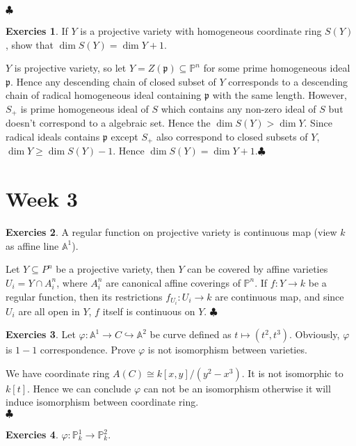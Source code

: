 \documentclass[12pt,a4paper]{article}
\theoremstyle{definition}
\newtheorem{exer}{Exercies}[subsection]
\newcommand*{\qeds}{\hfill\ensuremath{\clubsuit}}
\begin{document}
\qeds
\begin{exer}
	If $Y$ is a projective variety with homogeneous coordinate ring $S(Y)$, show that $\dim S(Y) = \dim Y +1$.
\end{exer}
$Y$ is projective variety, so let $Y= Z(\mathfrak{p}) \subseteq \mathbb{P}^n$ for some prime homogeneous ideal $\mathfrak{p}$. Hence any descending chain of closed subset of $Y$ corresponds to a descending chain of radical homogeneous ideal containing $\mathfrak{p}$ with the same length. However, $S_+$ is prime homogeneous ideal of $S$ which contains any non-zero ideal of $S$ but doesn't correspond to a algebraic set. Hence the $\dim S(Y) > \dim Y$. Since radical ideals contains $\mathfrak{p}$ except $S_+$ also correspond to closed subsets of $Y$, $\dim Y  \geq \dim S(Y)-1$. Hence $\dim S(Y) = \dim Y +1$.\qeds
\section{Week 3}
\begin{exer}
	A regular function on projective variety is continuous map (view $k$ as affine line $\mathbb{A}^1$).
\end{exer}
Let $Y \subseteq P^n$ be a projective variety, then $Y$ can be covered by affine varieties $U_i=Y \cap A^n_i$, where $A^n_i$ are canonical affine coverings of $\mathbb{P}^n$. If $f\colon Y \to k$ be a regular function, then its restrictions $f_{U_i} \colon U_i \to k$ are continuous map, and since $U_i$ are all open in $Y$, $f$ itself is continuous on $Y$. \qeds
\begin{exer}
	Let $\varphi: \mathbb{A}^1 \to C \hookrightarrow \mathbb{A}^2$ be curve defined as $ t \mapsto (t^2,t^3)$. Obviously, $\varphi$ is $1-1$ correspondence. Prove $\varphi$ is not isomorphism between varieties.
\end{exer}
We have coordinate ring $A(C) \cong k[x,y]/(y^2-x^3)$. It is not isomorphic to $k[t]$. Hence we can conclude $\varphi$ can not be an isomorphism otherwise it will induce isomorphism between coordinate ring. \\ \qeds
\begin{exer}
	$\varphi: \mathbb{P}^1_k \to \mathbb{P}^2_k$.
\end{exer}
\end{document}
